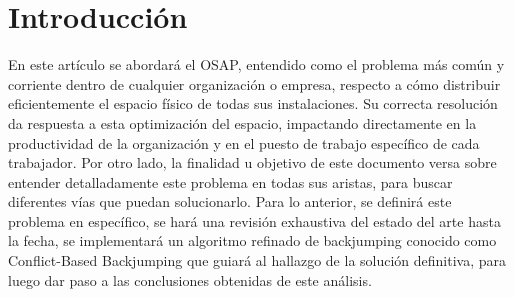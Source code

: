 \documentclass[letter, 10pt]{article}
\begin{document}
\begin{abstract}
En las grandes organizaciones existe el desaf\'io respecto a la distribuci\'on del espacio f\'isico de las oficinas, cub\'iculos, salas, entre otros, de la manera m\'as eficiente posible. Este reto es llamado \textit{Office Space Allocation Problem} (con sus siglas, OSAP), que consiste en asignar entidades (m\'aquinas, personas, roles, etc.) a un grupo de habitaciones disponibles, rigiend\'ose por diferentes tipos de restricciones para as\'i optimizar el uso del espacio. Este documento definir\'a el problema, a trav\'es de la revisi\'on de diferentes modelos existentes que se usan para resolver este tipo de obst\'aculos, para finalmente formular un algoritmo de backjumping, basado en una lista de conflictos (CBJ) que permita analizar c\'omo se desenvuelven las variables del sistema, con el objetivo de minimizar todo espacio que est\'e mal distribuido, es decir, el espacio que no se est\'e ocupando y el que se est\'e sobre utilizando.

\end{abstract}
\section{Introducci\'on}

En este art\'iculo se abordar\'a el OSAP, entendido como el problema m\'as com\'un y corriente dentro de cualquier organizaci\'on o empresa, respecto a c\'omo distribuir eficientemente el espacio f\'isico de todas sus instalaciones. Su correcta resoluci\'on da respuesta a esta optimizaci\'on del espacio, impactando directamente en la productividad de la organizaci\'on y en el puesto de trabajo espec\'ifico de cada trabajador. Por otro lado, la finalidad u objetivo de este documento versa sobre entender detalladamente este problema en todas sus aristas, para buscar diferentes v\'ias que puedan solucionarlo. Para lo anterior, se definir\'a este problema en espec\'ifico, se har\'a una revisi\'on exhaustiva del estado del arte hasta la fecha, se implementar\'a un algoritmo refinado de backjumping conocido como Conflict-Based Backjumping que guiar\'a al hallazgo de la soluci\'on definitiva, para luego dar paso a las conclusiones obtenidas de este an\'alisis.

\end{document}
